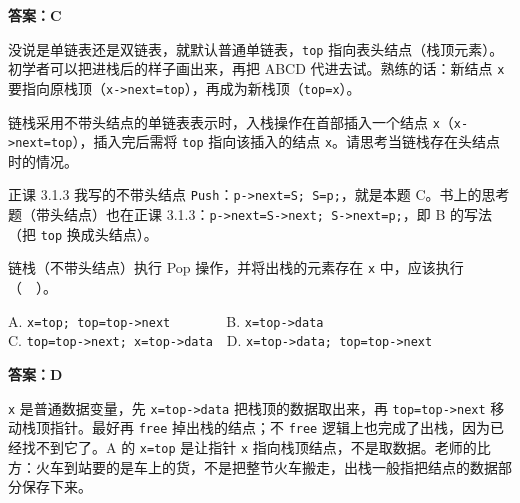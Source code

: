 \documentclass[10.5pt,a4paper,oneside]{article}
\newcommand{\hlred}[1]{\textcolor{wdred}{\bfseries #1}}
\begin{document}
\hlred{\textbf{答案：C}}

\begin{videobox}

没说是单链表还是双链表，就默认普通单链表，\texttt{top}
指向表头结点（栈顶元素）。初学者可以把进栈后的样子画出来，再把 ABCD
代进去试。熟练的话：新结点 \texttt{x}
要指向原栈顶（\texttt{x-\textgreater{}next=top}），再成为新栈顶（\texttt{top=x}）。

\end{videobox}

\begin{jiexibox}

链栈采用不带头结点的单链表表示时，入栈操作在首部插入一个结点
\texttt{x}（\texttt{x-\textgreater{}next=top}），插入完后需将
\texttt{top} 指向该插入的结点
\texttt{x}。请思考当链栈存在头结点时的情况。

\end{jiexibox}

\begin{recallbox}

正课 3.1.3 我写的不带头结点
\texttt{Push}：\texttt{p-\textgreater{}next=S;\ S=p;}，就是本题
C。书上的思考题（带头结点）也在正课
3.1.3：\texttt{p-\textgreater{}next=S-\textgreater{}next;\ S-\textgreater{}next=p;}，即
B 的写法（把 \texttt{top} 换成头结点）。

\end{recallbox}

\begin{questionbox}[11]

链栈（不带头结点）执行 Pop 操作，并将出栈的元素存在 \texttt{x}
中，应该执行（　）。

A. \texttt{x=top;\ top=top-\textgreater{}next}　　　　B.
\texttt{x=top-\textgreater{}data}\\
C. \texttt{top=top-\textgreater{}next;\ x=top-\textgreater{}data}　D.
\texttt{x=top-\textgreater{}data;\ top=top-\textgreater{}next}

\end{questionbox}

\hlred{\textbf{答案：D}}

\begin{videobox}

\texttt{x} 是普通数据变量，先 \texttt{x=top-\textgreater{}data}
把栈顶的数据取出来，再 \texttt{top=top-\textgreater{}next}
移动栈顶指针。最好再 \texttt{free} 掉出栈的结点；不 \texttt{free}
逻辑上也完成了出栈，因为已经找不到它了。A 的 \texttt{x=top} 是让指针
\texttt{x}
指向栈顶结点，不是取数据。老师的比方：火车到站要的是车上的货，不是把整节火车搬走，出栈一般指把结点的数据部分保存下来。

\end{videobox}
\end{document}
